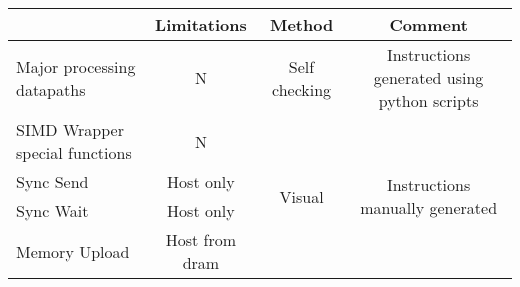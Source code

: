 \begin{table}[h]
  \centering
  \captionsetup{justification=centering}

  \begin{minipage}{1\textwidth}
    \centering
          \footnotesize
          \begin{tabular}{ |m{4cm}|c|c|c|m{3cm}|}
            \hline
            \rowcolor{gray!25}
 \multicolumn{1}{|c|}{Feature}          &   \multicolumn{2}{c|}{Limitations}                 & Method                  &   \multicolumn{1}{c|}{Comment}                                         \\
            \hline                                                                                                     
        Major processing datapaths      &   \multicolumn{2}{c|}{N}                           & Self checking           &  \multicolumn{1}{c|}{Instructions generated using python scripts}      \\\cline{1-5}
        SIMD Wrapper special functions  &   \multicolumn{2}{c|}{N}                           & \multirow{7}{*}{Visual} &  \multicolumn{1}{c|}{\multirow{7}{*}{Instructions manually generated}} \\\cline{1-3}
        Sync Send                       &   \multicolumn{2}{c|}{Host only}                   &                         &                                                                        \\\cline{1-3}
        Sync Wait                       &   \multicolumn{2}{c|}{Host only}                   &                         &                                                                        \\\cline{1-3}
        Memory Upload                   &   \multicolumn{2}{c|}{Host from \ac{dram}}         &                         &                                                                        \\\cline{1-3}

\end{tabular}
\end{minipage}
\end{table}
